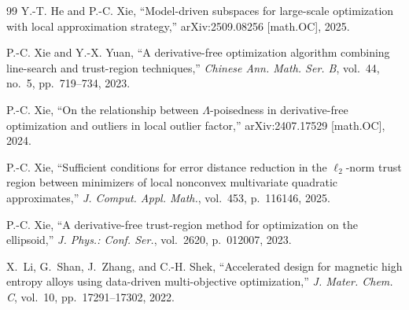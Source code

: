 \documentclass[11pt,a4paper]{article}
\begin{document}
\begin{thebibliography}{99}
Y.-T. He and P.-C. Xie, ``Model-driven subspaces for large-scale
optimization with local approximation strategy,''
arXiv:2509.08256 [math.OC], 2025.

P.-C. Xie and Y.-X. Yuan, ``A derivative-free optimization algorithm
combining line-search and trust-region techniques,'' \emph{Chinese
Ann. Math. Ser. B}, vol.~44, no.~5, pp.~719--734, 2023.

P.-C. Xie, ``On the relationship between $\Lambda$-poisedness in
derivative-free optimization and outliers in local outlier factor,''
arXiv:2407.17529 [math.OC], 2024.

P.-C. Xie, ``Sufficient conditions for error distance reduction in
the $\ell_2$-norm trust region between minimizers of local nonconvex
multivariate quadratic approximates,'' \emph{J. Comput. Appl.
Math.}, vol.~453, p.~116146, 2025.

P.-C. Xie, ``A derivative-free trust-region method for optimization
on the ellipsoid,'' \emph{J. Phys.: Conf. Ser.}, vol.~2620,
p.~012007, 2023.

X.~Li, G.~Shan, J.~Zhang, and C.-H. Shek,
``Accelerated design for magnetic high entropy alloys using
data-driven multi-objective optimization,''
\emph{J. Mater. Chem. C}, vol.~10, pp.~17291--17302, 2022.

\end{thebibliography}
\end{document}
